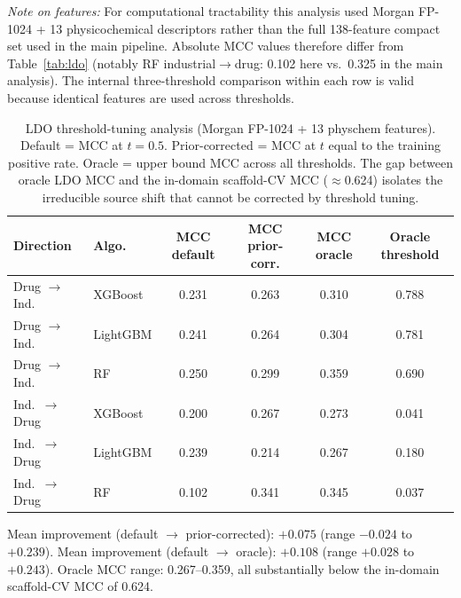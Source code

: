 \textit{Note on features:} For computational tractability this analysis used Morgan FP-1024 
+ 13 physicochemical descriptors rather than the full 138-feature compact set used in the 
main pipeline. Absolute MCC values therefore differ from Table~\ref{tab:ldo} (notably RF 
industrial$\to$drug: 0.102 here vs.\ 0.325 in the main analysis). The internal 
three-threshold comparison within each row is valid because identical features are used 
across thresholds.

\begin{table}[ht]
\caption{LDO threshold-tuning analysis (Morgan FP-1024 + 13 physchem features). Default = 
MCC at $t = 0.5$. Prior-corrected = MCC at $t$ equal to the training positive rate. Oracle 
= upper bound MCC across all thresholds. The gap between oracle LDO MCC and the in-domain 
scaffold-CV MCC ($\approx$0.624) isolates the irreducible source shift that cannot be 
corrected by threshold tuning.}
\centering
\small
\begin{tabular}{@{}llcccc@{}}
\toprule
Direction & Algo. & MCC default & MCC prior-corr. & MCC oracle & Oracle threshold \\
\midrule
Drug $\to$ Ind.\ & XGBoost  & 0.231 & 0.263 & 0.310 & 0.788 \\
Drug $\to$ Ind.\ & LightGBM & 0.241 & 0.264 & 0.304 & 0.781 \\
Drug $\to$ Ind.\ & RF       & 0.250 & 0.299 & 0.359 & 0.690 \\
Ind.\ $\to$ Drug & XGBoost  & 0.200 & 0.267 & 0.273 & 0.041 \\
Ind.\ $\to$ Drug & LightGBM & 0.239 & 0.214 & 0.267 & 0.180 \\
Ind.\ $\to$ Drug & RF       & 0.102 & 0.341 & 0.345 & 0.037 \\
\bottomrule
\end{tabular}

\medskip
\footnotesize
Mean improvement (default $\to$ prior-corrected): $+0.075$ (range $-0.024$ to $+0.239$).
Mean improvement (default $\to$ oracle): $+0.108$ (range $+0.028$ to $+0.243$).
Oracle MCC range: 0.267--0.359, all substantially below the in-domain scaffold-CV MCC of 
0.624.
\end{table}
